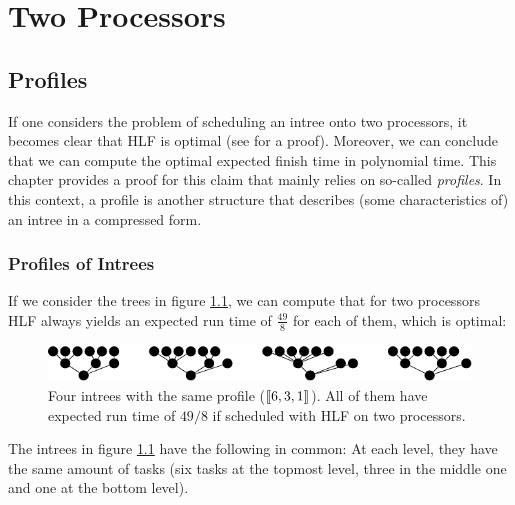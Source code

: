\chapter{Two Processors}
\label{chap:p2}


\section{Profiles}
\label{sec:p2-profiles}


If one considers the problem of scheduling an intree onto two processors, it becomes clear that HLF is optimal (see \cite{chandyreynoldsshortpaper1975} for a proof). Moreover, we can conclude that we can compute the optimal expected finish time in polynomial time. This chapter provides a proof for this claim that mainly relies on so-called \emph{profiles}. In this context, a profile is another structure that describes (some characteristics of) an intree in a compressed form.

\subsection{Profiles of Intrees}
\label{sec:p2-simple-method-runtime-profiles-for-intrees}

If we consider the trees in figure \ref{fig:p2-four-intrees-with-same-profile-6-3-1}, we can compute that for two processors HLF always yields an expected run time of $\frac{49}{8}$ for each of them, which is optimal:

\begin{figure}[ht]
  \centering
  \includegraphics{p2/four_profiles_631.pdf}  
  \caption{Four intrees with the same profile ($\left\llbracket 6,3,1 \right\rrbracket$). All of them have expected run time of $49/8$ if scheduled with HLF on two processors.}
  \label{fig:p2-four-intrees-with-same-profile-6-3-1}
\end{figure}

The intrees in figure \ref{fig:p2-four-intrees-with-same-profile-6-3-1} have the following in common: At each level, they have the same amount of tasks (six tasks at the topmost level, three in the middle one and one at the bottom level).

